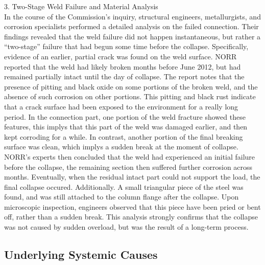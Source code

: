 \documentclass[12pt]{article}
\begin{document}
3. Two-Stage Weld Failure and Material Analysis \\
In the course of the Commission’s inquiry, structural engineers, metallurgists, and corrosion specialists performed a detailed analysis on the failed connection. Their findings revealed that the weld failure did not happen instantaneous, but rather a “two-stage” failure that had begun some time before the collapse. Specifically, evidence of an earlier, partial crack was found on the weld surface. NORR reported that the weld had likely broken months before June 2012, but had remained partially intact until the day of collapse.
The report notes that the presence of pitting and black oxide on some portions of the broken weld, and the absence of such corrosion on other portions. This pitting and black rust indicate that a crack surface had been exposed to the environment for a really long period. In the connection part, one portion of the weld fracture showed these features, this implys that this part of the weld was damaged earlier, and then kept corroding for a while. In contrast, another portion of the final breaking surface was clean, which implys a sudden break at the moment of collapse. NORR’s experts then concluded that the weld had experienced an initial failure before the collapse, the remaining section then suffered further corrosion across months. Eventually, when the residual intact part  could not support the load, the final collapse occured.
Additionally. A small triangular piece of the steel was found, and was still attached to the column flange after the collapse. Upon microscopic inspection, engineers observed that this piece have been pried or bent off, rather than a sudden break. This analysis strongly confirms that the collapse was not caused by sudden overload, but was the result of a long-term process.




\subsection{Underlying Systemic Causes}
\end{document}
